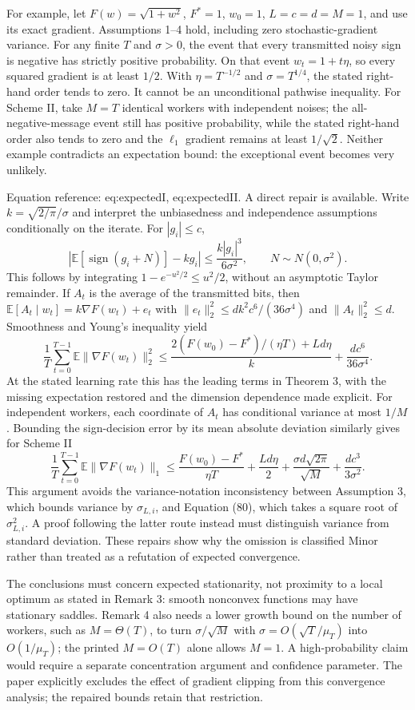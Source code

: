 \documentclass[10pt]{article}
\begin{document}
For example, let \(F(w)=\sqrt{1+w^2}\), \(F^*=1\), \(w_0=1\), \(L=c=d=M=1\), and use its exact gradient. Assumptions 1–4 hold, including zero stochastic-gradient variance. For any finite \(T\) and \(\sigma>0\), the event that every transmitted noisy sign is negative has strictly positive probability. On that event \(w_t=1+t\eta\), so every squared gradient is at least \(1/2\). With \(\eta=T^{-1/2}\) and \(\sigma=T^{1/4}\), the stated right-hand order tends to zero. It cannot be an unconditional pathwise inequality. For Scheme II, take \(M=T\) identical workers with independent noises; the all-negative-message event still has positive probability, while the stated right-hand order also tends to zero and the \(\ell_1\) gradient remains at least \(1/\sqrt2\). Neither example contradicts an expectation bound: the exceptional event becomes very unlikely.\par
Equation reference: eq:expectedI, eq:expectedII. A direct repair is available. Write \(k=\sqrt{2/\pi}/\sigma\) and interpret the unbiasedness and independence assumptions conditionally on the iterate. For \(|g_i|\le c\), \[\left|\mathbb E[\operatorname{sign}(g_i+N)]-kg_i\right|
\le \frac{k|g_i|^3}{6\sigma^2},\qquad N\sim N(0,\sigma^2).\] This follows by integrating \(1-e^{-u^2/2}\le u^2/2\), without an asymptotic Taylor remainder. If \(A_t\) is the average of the transmitted bits, then \(\mathbb E[A_t\mid w_t]=k\nabla F(w_t)+e_t\) with \(\|e_t\|_2^2\le dk^2c^6/(36\sigma^4)\) and \(\|A_t\|_2^2\le d\). Smoothness and Young’s inequality yield \[
\frac1T\sum_{t=0}^{T-1}\mathbb E\|\nabla F(w_t)\|_2^2
\le \frac{2(F(w_0)-F^*)/(\eta T)+Ld\eta}{k}
       +\frac{dc^6}{36\sigma^4}.\] At the stated learning rate this has the leading terms in Theorem 3, with the missing expectation restored and the dimension dependence made explicit. For independent workers, each coordinate of \(A_t\) has conditional variance at most \(1/M\). Bounding the sign-decision error by its mean absolute deviation similarly gives for Scheme II \[
\frac1T\sum_{t=0}^{T-1}\mathbb E\|\nabla F(w_t)\|_1
\le\frac{F(w_0)-F^*}{\eta T}+\frac{Ld\eta}{2}
       +\frac{\sigma d\sqrt{2\pi}}{\sqrt M}+\frac{dc^3}{3\sigma^2}.\] This argument avoids the variance-notation inconsistency between Assumption 3, which bounds variance by \(\sigma_{L,i}\), and Equation (80), which takes a square root of \(\sigma_{L,i}^2\). A proof following the latter route instead must distinguish variance from standard deviation. These repairs show why the omission is classified Minor rather than treated as a refutation of expected convergence.\par
The conclusions must concern expected stationarity, not proximity to a local optimum as stated in Remark 3: smooth nonconvex functions may have stationary saddles. Remark 4 also needs a lower growth bound on the number of workers, such as \(M=\Theta(T)\), to turn \(\sigma/\sqrt M\) with \(\sigma=O(\sqrt T/\mu_T)\) into \(O(1/\mu_T)\); the printed \(M=O(T)\) alone allows \(M=1\). A high-probability claim would require a separate concentration argument and confidence parameter. The paper explicitly excludes the effect of gradient clipping from this convergence analysis; the repaired bounds retain that restriction.\par
\end{document}
